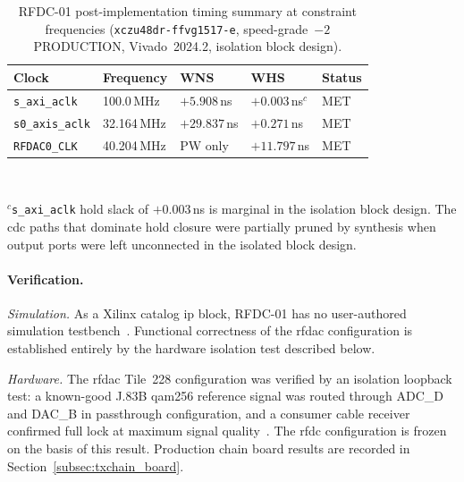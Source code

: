 \vspace{-30pt}\leavevmode\par
\begin{table}[!h]
  \caption{RFDC-01 post-implementation timing summary at constraint
           frequencies
           (\texttt{xczu48dr\allowbreak-ffvg1517\allowbreak-e}, speed-grade~$-2$
           PRODUCTION, Vivado~2024.2, isolation block design).}
  \label{tab:rfdc01_timing}
  \centering
  \begin{tabular}{lllll}
    \hline
    Clock                  & Frequency    & WNS              & WHS                    & Status \\
    \hline
    \texttt{s\_axi\_aclk}  & 100.0\,MHz   & $+5.908$\,ns     & $+0.003$\,ns$^{c}$     & MET    \\[2pt]
    \texttt{s0\_axis\_aclk}& 32.164\,MHz  & $+29.837$\,ns    & $+0.271$\,ns           & MET    \\[2pt]
    \texttt{RFDAC0\_CLK}   & 40.204\,MHz  & PW only          & $+11.797$\,ns          & MET    \\
    \hline
  \end{tabular}\\[4pt]
  \begin{minipage}{\linewidth}
    \small
    $^{c}$\texttt{s\_axi\_aclk} hold slack of $+0.003$\,ns is marginal
    in the isolation block design.
    The \ac{cdc} paths that dominate hold closure were partially pruned
    by synthesis when output ports were left unconnected in the isolated
    block design.
  \end{minipage}
\end{table}
\FloatBarrier


\paragraph{Verification.}

\textit{Simulation.}
As a Xilinx catalog \ac{ip} block, RFDC-01 has no user-authored
simulation testbench~\cite{AMD_PG269}.
Functional correctness of the \ac{rfdac} configuration is
established entirely by the hardware isolation test described below.

\textit{Hardware.}
The \ac{rfdac} Tile~228 configuration was verified by an isolation
loopback test: a known-good J.83B \ac{qam256} reference signal was
routed through ADC\_D and DAC\_B in passthrough configuration, and a
consumer cable receiver confirmed full lock at maximum signal
quality~\cite{RealDigital_A6,Kovacs2024}.
The \ac{rfdc} configuration is frozen on the basis of this result.
Production chain board results are recorded in
Section~\ref{subsec:txchain_board}.

